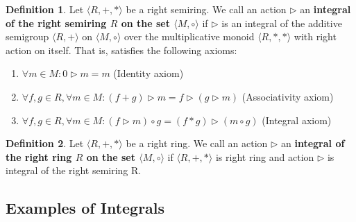 \documentclass[12pt]{article}
\theoremstyle{definition}
\newtheorem{definition}{Definition}[section]
\begin{document}
\newpage
\begin{definition} Let $\langle R, +, * \rangle$ be a right semiring. We call an action $\triangleright$ an \textbf{integral of the right semiring $R$ on the set $\langle M, \circ \rangle$} if $\triangleright$ is an integral of the additive semigroup $\langle R, + \rangle$ on $\langle M, \circ \rangle$ over the multiplicative monoid $\langle R, *, * \rangle$ with right action on itself. That is, satisfies the following axioms:

\begin{enumerate}
\item $\forall m \in M: 0 \triangleright m = m$ \hfill (Identity axiom)
\item $\forall f, g \in R, \forall m \in M: (f + g) \triangleright m = f \triangleright (g \triangleright m)$ \hfill (Associativity axiom)
\item $\forall f, g \in R, \forall m \in M: (f \triangleright m) \circ g = (f * g) \triangleright (m \circ g)$ \hfill (Integral axiom)
\end{enumerate}
\end{definition}

\vspace{10pt}
\begin{definition} Let $\langle R, +, * \rangle$ be a right ring. We call an action $\triangleright$ an \textbf{integral of the right ring $R$ on the set $\langle M, \circ \rangle$} if $\langle R, +, * \rangle$ is right ring and action $\triangleright$ is integral of the right semiring R.
\end{definition}

\subsection{Examples of Integrals}
\end{document}
